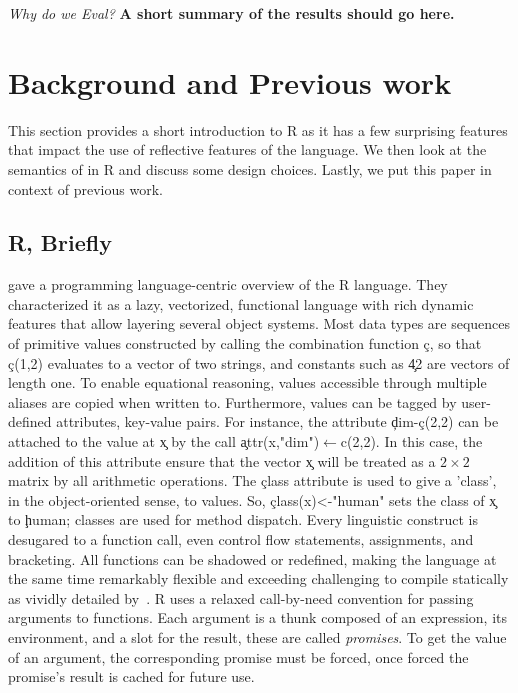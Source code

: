 \documentclass[screen,acmsmall]{acmart}
\begin{document}
\vspace{2mm}\noindent\emph{Why do we Eval?} {\bf A short summary of the
results should go here.}


\section{Background and Previous work}

This section provides a short introduction to R as it has a few
surprising features that impact the use of reflective features of the
language. We then look at the semantics of \eval in R and discuss some
design choices. Lastly, we put this paper in context of previous work.

\subsection{R, Briefly}

\citet{ecoop12} gave a programming language-centric overview of the R language.
They characterized it as a lazy, vectorized, functional language with rich
dynamic features that allow layering several object systems. Most data types are
sequences of primitive values constructed by calling the combination function
\c{c}, so that \c{c(1,2)} evaluates to a vector of two strings, and constants
such as \c{42} are vectors of length one. To enable equational reasoning, values
accessible through multiple aliases are copied when written to. Furthermore,
values can be tagged by user-defined attributes, key-value pairs. For instance,
the attribute \c{dim}-\c{c(2,2)} can be attached to the value at \c{x} by the
call \c{attr(x,"dim")$\leftarrow$c(2,2)}. In this case, the addition of this
attribute ensure that the vector \c x will be treated as a $2 \times 2$ matrix
by all arithmetic operations. The \c{class} attribute is used to give a 'class',
in the object-oriented sense, to values. So, \c{class(x)<-"human"} sets the
class of \c{x} to \c{human}; classes are used for method dispatch. Every
linguistic construct is desugared to a function call, even control flow
statements, assignments, and bracketing. All functions can be shadowed or
redefined, making the language at the same time remarkably flexible and
exceeding challenging to compile statically as vividly detailed
by~\citet{dls19}. R uses a relaxed call-by-need convention for passing arguments
to functions. Each argument is a thunk composed of an expression, its
environment, and a slot for the result, these are called \emph{promises}. To get
the value of an argument, the corresponding promise must be forced, once forced
the promise's result is cached for future use.
\end{document}
